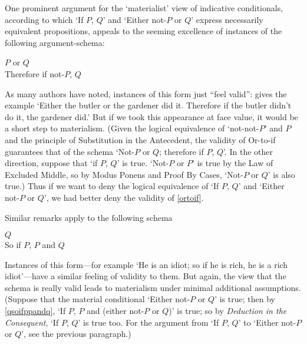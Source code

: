 \documentclass[If.tex]{subfiles}
\begin{document}
One prominent argument for the ‘materialist’ view of indicative conditionals, according to which ‘If $P$, $Q$’ and ‘Either not-$P$ or $Q$’ express necessarily equivalent propositions, appeals to the seeming excellence of instances of the following argument-schema:
\begin{prop}
	\sitem[Or-to-if] \label{ortoif}
	\parbox[t]{\linewidth}{$P$ or $Q$\\
	Therefore if not-$P$, $Q$}
\end{prop}
As many authors have noted, instances of this form just “feel valid”: \citet{StalnakerIC} gives the example ‘Either the butler or the gardener did it.  Therefore if the butler didn't do it, the gardener did.’  But if we took this appearance at face value, it would be a short step to materialism.  (Given the logical equivalence of ‘not-not-$P$’ and $P$ and the principle of Substitution in the Antecedent, the validity of Or-to-if guarantees that of the schema ‘Not-$P$ or $Q$; therefore if $P$, $Q$’.  In the other direction, suppose that ‘if $P$, $Q$’ is true.   ‘Not-$P$ or $P$’ is true by the Law of Excluded Middle, so by Modus Ponens and Proof By Cases, ‘Not-$P$ or $Q$’ is also true.)  Thus if we want to deny the logical equivalence of ‘If $P$, $Q$’ and ‘Either not-$P$ or $Q$’, we had better deny the validity of \ref{ortoif}.  

Similar remarks apply to the following schema
\begin{prop}
	 \label{qsoifppandq}
	\parbox[t]{\linewidth}{$Q$\\
	So if $P$, $P$ and $Q$}
\end{prop}
Instances of this form---for example ‘He is an idiot; so if he is rich, he is a rich idiot’---have a similar feeling of validity to them.  But again, the view that the schema is really valid leads to materialism under minimal additional assumptions.  (Suppose that the material conditional ‘Either not-$P$ or $Q$’ is true; then by \ref{qsoifppandq}, ‘If $P$, $P$ and (either not-$P$ or $Q$)’ is true; so by \emph{Deduction in the Consequent}, ‘If $P$, $Q$’ is true too.  For the argument from ‘If $P$, $Q$’ to ‘Either not-$P$ or $Q$’, see the previous paragraph.)
\end{document}
